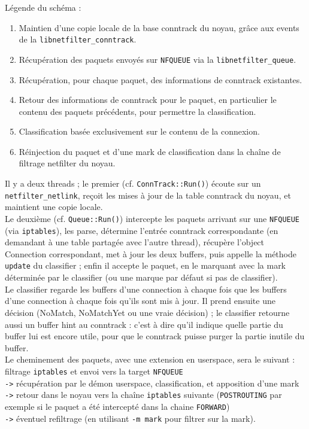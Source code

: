 \begin{footnotesize}
\noindent Légende du schéma :

\begin{enumerate}
\item Maintien d'une copie locale de la base conntrack du noyau, grâce aux \og events \fg{} de la \verb+libnetfilter_conntrack+.
\item Récupération des paquets envoyés sur \verb+NFQUEUE+ via la \verb+libnetfilter_queue+.
\item Récupération, pour chaque paquet, des informations de conntrack existantes.
\item Retour des informations de conntrack pour le paquet, en particulier le contenu des paquets précédents, pour permettre la classification.
\item Classification basée exclusivement sur le contenu de la connexion.
\item Réinjection du paquet et d'une \og mark \fg{} de classification dans la chaîne de filtrage netfilter du noyau.
\end{enumerate}
\end{footnotesize}

Il y a deux threads ; le premier (cf. \verb+ConnTrack::Run()+) écoute sur un
\verb+netfilter_netlink+, reçoit les mises à jour de la table conntrack du noyau, et
maintient une copie locale.\\

Le deuxième (cf. \verb+Queue::Run()+) intercepte les paquets arrivant sur une
\verb+NFQUEUE+ (via \verb+iptables+), les parse, détermine l'entrée conntrack
correspondante (en demandant à une table partagée avec l'autre
thread), récupère l'object \og Connection \fg{} correspondant, met à jour les
deux buffers, puis appelle la méthode \verb+update+ du classifier ; enfin il
accepte le paquet, en le marquant avec la mark déterminée par le
classifier (ou une marque par défaut si pas de classifier).\\

Le classifier regarde les buffers d'une connection à chaque fois que les buffers d'une connection à chaque fois qu'ils sont mis à jour. Il prend ensuite une décision (NoMatch, NoMatchYet ou une vraie décision) ; le classifier retourne aussi un \og buffer hint \fg{} au conntrack : c'est à dire qu'il indique quelle
partie du buffer lui est encore utile, pour que le conntrack puisse
purger la partie inutile du buffer.\\

Le cheminement des paquets, avec une extension en userspace, sera le suivant :\\
filtrage \verb+iptables+ et envoi vers la target \verb+NFQUEUE+\\
\verb+->+ récupération par le démon userspace, classification, et apposition d'une mark\\
\verb+->+ retour dans le noyau vers la chaîne \verb+iptables+ suivante (\verb+POSTROUTING+ par exemple si le paquet a été intercepté dans la chaine \verb+FORWARD+)\\
\verb+->+ éventuel refiltrage (en utilisant \verb+-m mark+ pour filtrer sur la mark).

